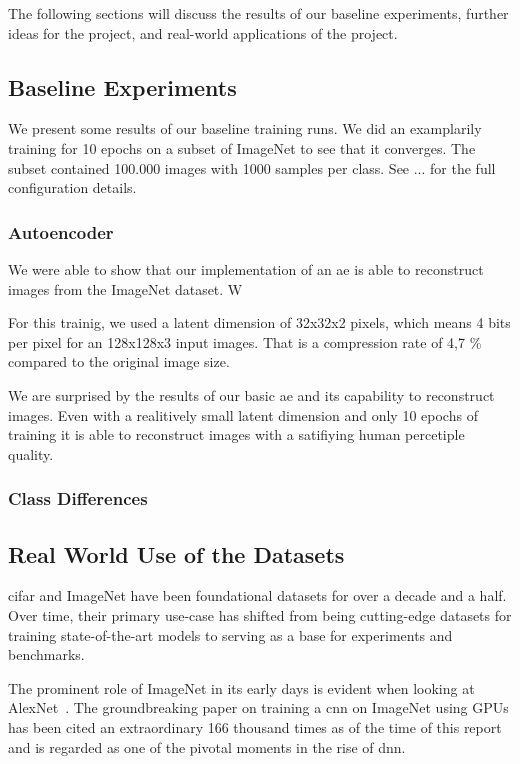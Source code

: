 The following sections will discuss the results of our baseline experiments, further ideas for the project, and real-world applications of the project.

\subsection{Baseline Experiments}\label{subsec:baseline-results}
    We present some results of our baseline training runs. We did an examplarily training for 10 epochs on a subset of ImageNet to see that it converges. The subset contained 100.000 images with 1000 samples per class. See ... for the full configuration details.

    \subsubsection{Autoencoder}\label{subsubsec:autoencoder}
        We were able to show that our implementation of an \ac{ae} is able to reconstruct images from the ImageNet dataset. W

        For this trainig, we used a latent dimension of 32x32x2 pixels, which means 4 bits per pixel for an 128x128x3 input images. That is a compression rate of 4,7 \% compared to the original image size.

        We are surprised by the results of our basic \ac{ae} and its capability to reconstruct images. Even with a realitively small latent dimension and only 10 epochs of training it is able to reconstruct images with a satifiying human percetiple quality.
        

\subsubsection{Class Differences}\label{subsubsec:class-differences}

\subsection{Real World Use of the Datasets}\label{subsec:real-world-applications}
\ac{cifar} and ImageNet have been foundational datasets for over a decade and a half.
Over time, their primary use-case has shifted from being cutting-edge datasets for training state-of-the-art models
to serving as a base for experiments and benchmarks.

The prominent role of ImageNet in its early days is evident when looking at AlexNet~\cite{AlexNet}.
The groundbreaking paper on training a \ac{cnn} on ImageNet using GPUs has been cited an extraordinary 166 thousand
times as of the time of this report and is regarded as one of the pivotal moments in the rise of \ac{dnn}.

